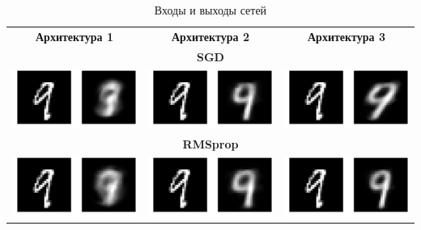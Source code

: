 \documentclass[12pt, a4paper]{article}
\begin{document}
            \begin{table}\caption{Входы и выходы сетей}
            \label{tab:io}
            \begin{tabular}{c c c}
                \textbf{Архитектура 1} & \textbf{Архитектура 2} & \textbf{Архитектура 3}\\
                \multicolumn{3}{c}{\textbf{SGD}}\\
                \includegraphics[width=0.3\linewidth]{pics/arch1_sgd} &
                \includegraphics[width=0.3\linewidth]{pics/arch2_sgd} &
                \includegraphics[width=0.3\linewidth]{pics/arch3_sgd} \\
                \multicolumn{3}{c}{\textbf{RMSprop}}\\
                \includegraphics[width=0.3\linewidth]{pics/arch1_rmsprop} &
                \includegraphics[width=0.3\linewidth]{pics/arch2_rmsprop} &
                \includegraphics[width=0.3\linewidth]{pics/arch3_rmsprop} \\

\end{tabular}
\end{table}
\end{document}
